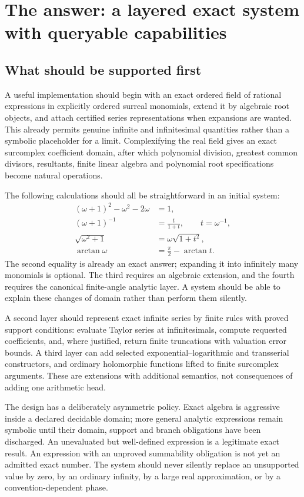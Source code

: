 \documentclass[11pt,letterpaper]{article}
\numberwithin{equation}{section}
\theoremstyle{definition}
\theoremstyle{remark}
\begin{document}
\section{The answer: a layered exact system with queryable capabilities}
\label{cas:sec-answer}

\subsection{What should be supported first}
\label{cas:sub-first}
A useful implementation should begin with an exact ordered field of rational
expressions in explicitly ordered surreal monomials, extend it by algebraic root
objects, and attach certified series representations when expansions are wanted.
This already permits genuine infinite and infinitesimal quantities rather than a
symbolic placeholder for a limit. Complexifying the real field gives an exact
surcomplex coefficient domain, after which polynomial division, greatest common
divisors, resultants, finite linear algebra and polynomial root specifications
become natural operations.

The following calculations should all be straightforward in an initial system:
\begin{align*}
 (\omega+1)^2-\omega^2-2\omega&=1,\\
 (\omega+1)^{-1}&=\frac{t}{1+t},\qquad t=\omega^{-1},\\
 \sqrt{\omega^2+1}&=\omega\sqrt{1+t^2},\\
 \arctan\omega&=\frac\pi2-\arctan t.
\end{align*}
The second equality is already an exact answer; expanding it into infinitely
many monomials is optional. The third requires an algebraic extension, and the
fourth requires the canonical finite-angle analytic layer. A system should be
able to explain these changes of domain rather than perform them silently.

A second layer should represent exact infinite series by finite rules with
proved support conditions: evaluate Taylor series at infinitesimals, compute
requested coefficients, and, where justified, return finite truncations with
valuation error bounds. A third layer can add selected exponential--logarithmic
and transserial constructors, and ordinary holomorphic functions lifted to
finite surcomplex arguments. These are extensions with additional semantics, not
consequences of adding one arithmetic head.

The design has a deliberately asymmetric policy. Exact algebra is aggressive
inside a declared decidable domain; more general analytic expressions remain
symbolic until their domain, support and branch obligations have been
discharged. An unevaluated but well-defined expression is a legitimate exact
result. An expression with an unproved summability obligation is not yet an
admitted exact number. The system should never silently replace an unsupported
value by zero, by an ordinary infinity, by a large real approximation, or by a
convention-dependent phase.
\end{document}
